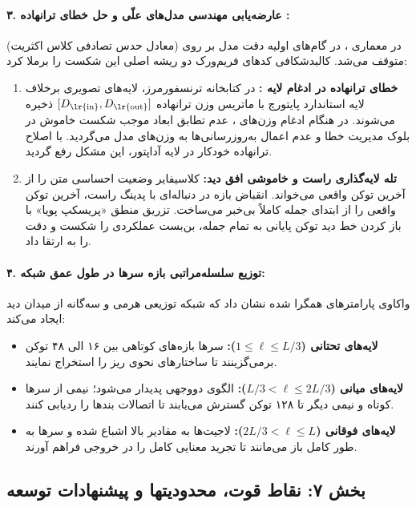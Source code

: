 \paragraph{۳. عارضه‌یابی مهندسی مدل‌های علّی و حل خطای ترانهاده :}
در معماری ، در گام‌های اولیه دقت مدل بر روی  (معادل حدس تصادفی کلاس اکثریت) متوقف می‌شد. کالبدشکافی کدهای فریم‌ورک دو ریشه اصلی این شکست را برملا کرد:
\begin{enumerate}
    \item \textbf{خطای ترانهاده در ادغام لایه :} در کتابخانه ترنسفورمرز، لایه‌های تصویری  برخلاف لایه استاندارد پایتورچ با ماتریس وزن ترانهاده $[D_{\text{\lr{in}}}, D_{\text{\lr{out}}}]$ ذخیره می‌شوند. در هنگام ادغام وزن‌های ، عدم تطابق ابعاد موجب شکست خاموش در بلوک مدیریت خطا و عدم اعمال به‌روزرسانی‌ها به وزن‌های مدل می‌گردید. با اصلاح ترانهاده خودکار در لایه آداپتور، این مشکل رفع گردید.
    \item \textbf{تله لایه‌گذاری راست  و خاموشی افق دید:} کلاسیفایر  وضعیت احساسی متن را از آخرین توکن واقعی می‌خواند. انقباض بازه در دنباله‌ای با پدینگ راست، آخرین توکن واقعی را از ابتدای جمله کاملاً بی‌خبر می‌ساخت. تزریق منطق «پریسکپ پویا» با باز کردن خط دید توکن پایانی به تمام جمله، بن‌بست عملکردی را شکست و دقت را به  ارتقا داد.
\end{enumerate}

\paragraph{۴. توزیع سلسله‌مراتبی بازه سرها در طول عمق شبکه:}
واکاوی پارامترهای همگرا شده نشان داد که شبکه توزیعی هرمی و سه‌گانه از میدان دید ایجاد می‌کند:
\begin{itemize}
    \item \textbf{لایه‌های تحتانی ($1 \le \ell \le L/3$):} سرها بازه‌های کوتاهی بین ۱۶ الی ۴۸ توکن برمی‌گزینند تا ساختارهای نحوی ریز را استخراج نمایند.
    \item \textbf{لایه‌های میانی ($L/3 < \ell \le 2L/3$):} الگوی دووجهی پدیدار می‌شود؛ نیمی از سرها کوتاه و نیمی دیگر تا ۱۲۸ توکن گسترش می‌یابند تا اتصالات بندها را ردیابی کنند.
    \item \textbf{لایه‌های فوقانی ($2L/3 < \ell \le L$):} لاجیت‌ها به مقادیر بالا اشباع شده و سرها به طور کامل باز می‌مانند تا تجرید معنایی کامل را در خروجی فراهم آورند.
\end{itemize}

\subsection*{بخش ۷: نقاط قوت، محدودیتها و پیشنهادات توسعه }

